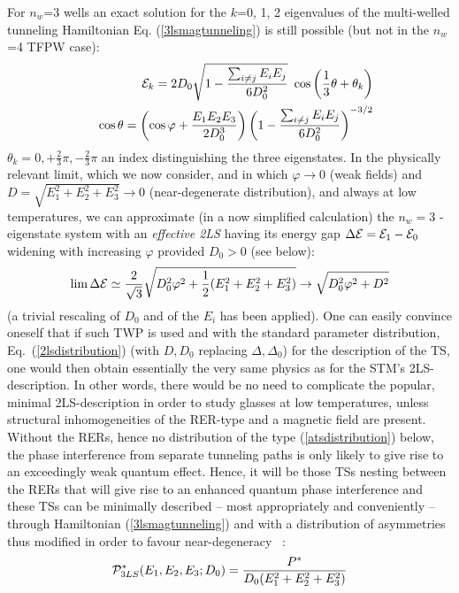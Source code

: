 \documentclass[10pt]{article}
\begin{document}
For $n_w$=3 wells an exact solution for the $k$=0, 1, 2 eigenvalues of the
multi-welled tunneling Hamiltonian Eq. (\ref{3lsmagtunneling}) is still 
possible (but not in the $n_w$=4 TFPW case):
\begin{eqnarray}
&&{\cal E}_k = 2D_0\sqrt{ 1-\frac{\sum_{i\not=j}E_iE_j}{6D_0^2} } ~
\cos\bigg( \frac{1}{3}\theta+\theta_k \bigg)
\label{3ls} \\
&&\cos\theta = \left( \cos\varphi+\frac{E_1E_2E_3}{2D_0^3} \right)
\left( 1-\frac{\sum_{i\not=j}E_iE_j}{6D_0^2} \right)^{-3/2}
\nonumber
\label{solution}
\end{eqnarray}
$\theta_k=0,+\frac{2}{3}\pi,-\frac{2}{3}\pi$ an index distinguishing the three
eigenstates. In the physically relevant limit, which we now consider, and in which 
$\varphi\to 0$ (weak fields) and
$D=\sqrt{E_1^2+E_2^2+E_3^2}\to 0$ (near-degenerate distribution), and 
always at low temperatures, we can approximate (in a now simplified calculation) 
the $n_w=3$ - eigenstate system with an {\em effective 2LS} having
its energy gap $\Delta{\cal E}={\cal E}_1-{\cal E}_0$ widening with increasing 
$\varphi$ provided $D_0>0$ (see below):
\begin{equation}
\lim\Delta{\cal E}\simeq
\frac{2}{\sqrt{3}}\sqrt{ D_0^2\varphi^2+\frac{1}{2}(E_1^2+E_2^2+E_3^2) }
\to \sqrt{D_0^2\varphi^2+D^2}
\label{3gap}
\end{equation}
(a trivial rescaling of $D_0$ and of the $E_i$ has been applied).
One can easily convince oneself that if such TWP is used and with the standard 
parameter distribution, Eq.~(\ref{2lsdistribution}) (with $D, D_0$ replacing 
$\Delta, \Delta_0$) for the description of the TS, one would then obtain 
essentially the very same physics as for the STM's 2LS-description. In other 
words, there would be no need to complicate the popular, minimal 2LS-description 
in order to study glasses at low temperatures, unless structural inhomogeneities of 
the RER-type and a magnetic field are present. Without the RERs, hence no 
distribution of the type (\ref{atsdistribution}) below, the phase interference from 
separate tunneling paths is only likely to give rise to an exceedingly weak quantum 
effect. Hence, it will be those TSs nesting between the RERs that will give rise to 
an enhanced quantum phase interference and these TSs can be minimally 
described -- most appropriately and conveniently -- through Hamiltonian 
(\ref{3lsmagtunneling}) and with a distribution of asymmetries
thus modified in order to favour near-degeneracy ~\cite{Jug2004}:
\begin{equation}
{\cal P}_{3LS}^*(E_1,E_2,E_3;D_0)=\frac{P^{\ast}}{D_0(E_1^2+E_2^2+E_3^2)}
\label{atsdistribution}
\end{equation}
\end{document}
